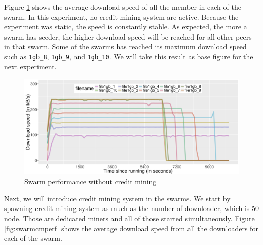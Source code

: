Figure \ref{fig:swarmnocmperf} shows the average download speed of all the member in each of the swarm. In this experiment, no credit mining system are active. Because the experiment was static, the speed is constantly stable. As expected, the more a swarm has seeder, the higher download speed will be reached for all other peers in that swarm. Some of the swarms has reached its maximum download speed such as \texttt{1gb\_8}, \texttt{1gb\_9}, and \texttt{1gb\_10}. We will take this result as base figure for the next experiment.

\begin{figure}[h]
	\centering
	\includegraphics[width=\textwidth]{pics/results/swperf_n2.png}
	\caption{Swarm performance without credit mining}
	\label{fig:swarmnocmperf}
\end{figure}

Next, we will introduce credit mining system in the swarms. We start by spawning credit mining system as much as the number of downloader, which is 50 node. Those are dedicated miners and all of those started simultaneously. Figure \ref{fig:swarmcmperf} shows the average download speed from all the downloaders for each of the swarm. 

